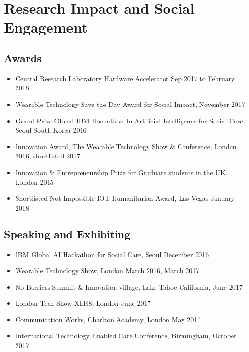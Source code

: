 \chapter{Research Impact and Social Engagement}

\section{Awards}
\begin{itemize}
    \item Central Research Laboratory Hardware Accelerator Sep 2017 to February 2018 
    \item Wearable Technology Save the Day Award for Social Impact, November 2017
    \item Grand Prize Global IBM Hackathon In Artificial Intelligence for Social Care, Seoul South Korea 2016
    \item Innovation Award, The Wearable Technology Show \& Conference, London 2016, shortlisted 2017
    \item Innovation \& Entrepreneurship Prize for Graduate students in the UK, London 2015 
    \item Shortlisted Not Impossible IOT Humanitarian Award, Las Vegas January 2018
\end{itemize}

\section{Speaking and Exhibiting}
\begin{itemize}
    \item IBM Global AI Hackathon for Social Care, Seoul December 2016
    \item Wearable Technology Show, London March 2016, March 2017
    \item No Barriers Summit \& Innovation village, Lake Tahoe California, June 2017
    \item London Tech Show XLR8, London June 2017
    \item Communication Works, Charlton Academy, London May 2017
    \item International Technology Enabled Care Conference, Birmingham, October 2017 
\end{itemize}

